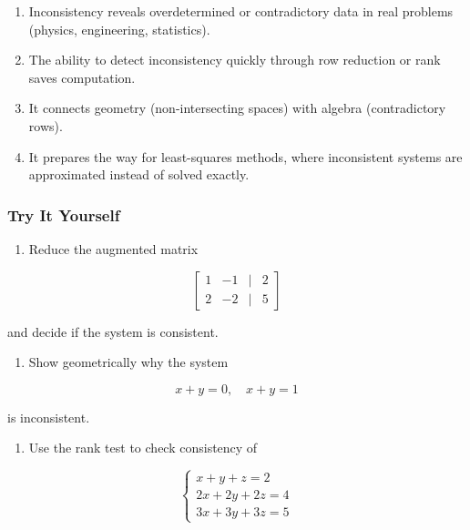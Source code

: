 \documentclass[
  letterpaper,
  DIV=11,
  numbers=noendperiod]{scrreprt}
\providecommand{\tightlist}{%
  \setlength{\itemsep}{0pt}\setlength{\parskip}{0pt}}
\begin{document}
\begin{enumerate}
\def\labelenumi{\arabic{enumi}.}
\tightlist
\item
  Inconsistency reveals overdetermined or contradictory data in real
  problems (physics, engineering, statistics).
\item
  The ability to detect inconsistency quickly through row reduction or
  rank saves computation.
\item
  It connects geometry (non-intersecting spaces) with algebra
  (contradictory rows).
\item
  It prepares the way for least-squares methods, where inconsistent
  systems are approximated instead of solved exactly.
\end{enumerate}

\subsubsection{Try It Yourself}\label{try-it-yourself-25}

\begin{enumerate}
\def\labelenumi{\arabic{enumi}.}
\tightlist
\item
  Reduce the augmented matrix
\end{enumerate}

\[
\begin{bmatrix}  
1 & -1 & | & 2 \\  
2 & -2 & | & 5  
\end{bmatrix}
\]

and decide if the system is consistent.

\begin{enumerate}
\def\labelenumi{\arabic{enumi}.}
\setcounter{enumi}{1}
\tightlist
\item
  Show geometrically why the system
\end{enumerate}

\[
x + y = 0, \quad x + y = 1
\]

is inconsistent.

\begin{enumerate}
\def\labelenumi{\arabic{enumi}.}
\setcounter{enumi}{2}
\tightlist
\item
  Use the rank test to check consistency of
\end{enumerate}

\[
\begin{cases}  
x + y + z = 2 \\  
2x + 2y + 2z = 4 \\  
3x + 3y + 3z = 5  
\end{cases}
\]
\end{document}
